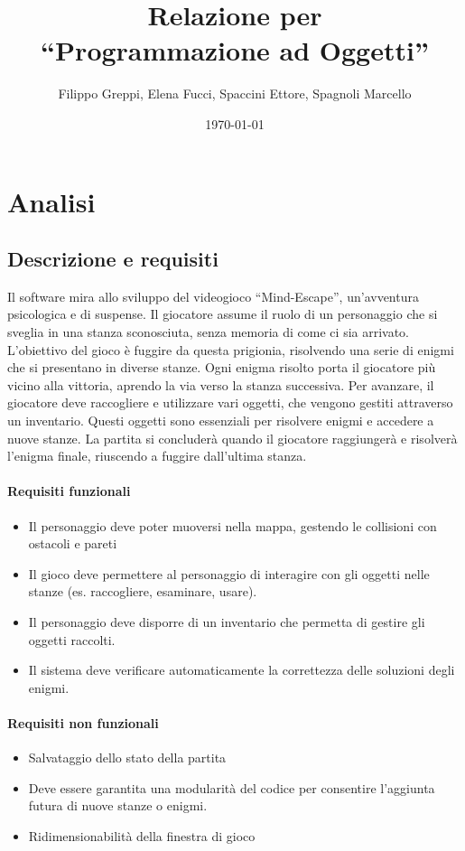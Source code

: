 \documentclass[a4paper,12pt]{report}
\title{Relazione per\\``Programmazione ad Oggetti''}
\author{Filippo Greppi, Elena Fucci, Spaccini Ettore, Spagnoli Marcello}
\date{\today}
\begin{document}
\tableofcontents

\chapter{Analisi}

\section{Descrizione e requisiti}
Il software mira allo sviluppo del videogioco “Mind-Escape”, un’avventura psicologica e di suspense. Il giocatore assume il ruolo di un personaggio che si sveglia in una stanza sconosciuta, senza memoria di come ci sia arrivato. L’obiettivo del gioco è fuggire da questa prigionia, risolvendo una serie di enigmi che si presentano in diverse stanze. Ogni enigma risolto porta il giocatore più vicino alla vittoria, aprendo la via verso la stanza successiva.
%
Per avanzare, il giocatore deve raccogliere e utilizzare vari oggetti, che vengono gestiti attraverso un inventario. Questi oggetti sono essenziali per risolvere enigmi e accedere a nuove stanze.
%
La partita si concluderà quando il giocatore raggiungerà e risolverà l’enigma finale, riuscendo a fuggire dall’ultima stanza.
%

\subsubsection{Requisiti funzionali}
\begin{itemize}
	\item Il personaggio deve poter muoversi nella mappa, gestendo le collisioni con ostacoli e pareti
	\item Il gioco deve permettere al personaggio di interagire con gli oggetti nelle stanze (es. raccogliere, esaminare, usare).
	\item Il personaggio deve disporre di un inventario che permetta di gestire gli oggetti raccolti.
	\item Il sistema deve verificare automaticamente la correttezza delle soluzioni degli enigmi.
\end{itemize}

\subsubsection{Requisiti non funzionali}
\begin{itemize}
	\item Salvataggio dello stato della partita
	\item Deve essere garantita una modularità del codice per consentire l'aggiunta futura di nuove stanze o enigmi.
	\item Ridimensionabilità della finestra di gioco
\end{itemize}
\end{document}
